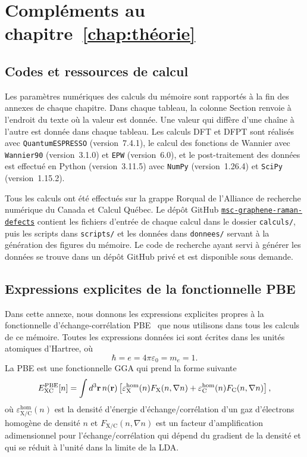 \chapter{Compléments au chapitre~\ref{chap:théorie}}\label{annexe:théorie}

\section{Codes et ressources de calcul}\label{sec:annexe_codes}

Les paramètres numériques des calculs du mémoire sont rapportés à la fin des annexes de chaque chapitre. Dans chaque tableau, la colonne \og Section \fg{} renvoie à l'endroit du texte où la valeur est donnée. Une valeur qui diffère d'une chaîne à l'autre est donnée dans chaque tableau. Les calculs DFT et DFPT sont réalisés avec \texttt{QuantumESPRESSO} (version~7.4.1), le calcul des fonctions de Wannier avec \texttt{Wannier90} (version~3.1.0) et \texttt{EPW} (version~6.0), et le post-traitement des données est effectué en Python (version~3.11.5) avec \texttt{NumPy} (version~1.26.4) et \texttt{SciPy} (version~1.15.2).

Tous les calculs ont été effectués sur la grappe Rorqual de l'Alliance de recherche numérique du Canada et Calcul Québec. Le dépôt GitHub \href{https://github.com/Gregb26/msc-graphene-raman-defects}{\texttt{msc-graphene-raman-defects}} contient les fichiers d'entrée de chaque calcul dans le dossier \texttt{calculs/}, puis les scripts dans \texttt{scripts/} et les données dans \texttt{donnees/} servant à la génération des figures du mémoire. Le code de recherche ayant servi à générer les données se trouve dans un dépôt GitHub privé et est disponible sous demande.

\clearpage
\section{Expressions explicites de la fonctionnelle PBE}\label{annexe:pbe}

Dans cette annexe, nous donnons les expressions explicites propres à la fonctionnelle d'échange-corrélation PBE~\cite{perdewGeneralizedGradientApproximation1996a} que nous utilisons dans tous les calculs de ce mémoire. Toutes les expressions données ici sont écrites dans les unités atomiques d'Hartree, où
\begin{equation}
    \hbar = e = 4\pi\varepsilon_0 = m_e = 1.
    \label{eqn:a1_unités_hartree}
\end{equation}
La PBE est une fonctionnelle GGA qui prend la forme suivante
\begin{equation}
    E_\text{XC}^\text{PBE}[n]=\int d^3\mathbf{r}\,n(\mathbf{r})\left[\varepsilon_\text{X}^\text{hom}(n)F_\text{X}(n,\nabla n)+\varepsilon_\text{C}^\text{hom}(n)F_\text{C}(n,\nabla n)\right],
    \label{eqn:a1_EPBE}
\end{equation}
où $\varepsilon_\text{X/C}^\text{hom}(n)$ est la densité d'énergie d'échange/corrélation d'un gaz d'électrons homogène de densité $n$ et $F_\text{X/C}(n,\nabla n)$ est un facteur d'amplification adimensionnel pour l'échange/corrélation qui dépend du gradient de la densité et qui se réduit à l'unité dans la limite de la LDA.


